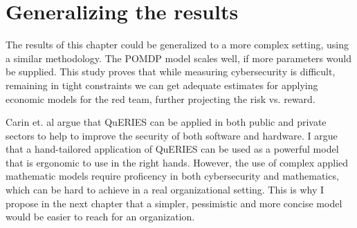 \section{Generalizing the results}

The results of this chapter could be generalized to a more complex
setting, using a similar methodology. The POMDP model scales well, if
more parameters would be supplied. This study proves that while
measuring cybersecurity is difficult, remaining in tight constraints
we can get adequate estimates for applying economic models for the red
team, further projecting the risk vs. reward.

Carin et. al \cite{carin2008cybersecurity} argue that QuERIES can be
applied in both public and private sectors to help to improve the
security of both software and hardware. I argue that a hand-tailored
application of QuERIES can be used as a powerful model that is
ergonomic to use in the right hands. However, the use of complex
applied mathematic models require proficency in both cybersecurity and
mathematics, which can be hard to achieve in a real organizational
setting. This is why I propose in the next chapter that a simpler,
pessimistic and more concise model would be easier to reach for an
organization.
